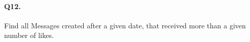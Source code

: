 \paragraph{Q12.}

Find all Messages created after a given date, that received more than a
given number of likes.
